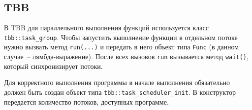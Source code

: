 \documentclass{report}
\begin{document}
\subsection{TBB}
В TBB для параллельного выполнения функций используется класс\\ \lstinline{tbb::task_group}. Чтобы запустить выполнение функции в отдельном потоке нужно вызвать метод \lstinline{run(...)} и передать в него объект типа \lstinline{Func} (в данном случае~-- лямбда-выражение). После всех вызовов \lstinline{run} вызывается метод \lstinline{wait()}, который синхронизирует потоки.
\par Для корректного выполнения программы в начале выполнения обязательно должен быть создан объект типа \lstinline{tbb::task_scheduler_init}. В конструктор передается количество потоков, доступных программе.
\end{document}

